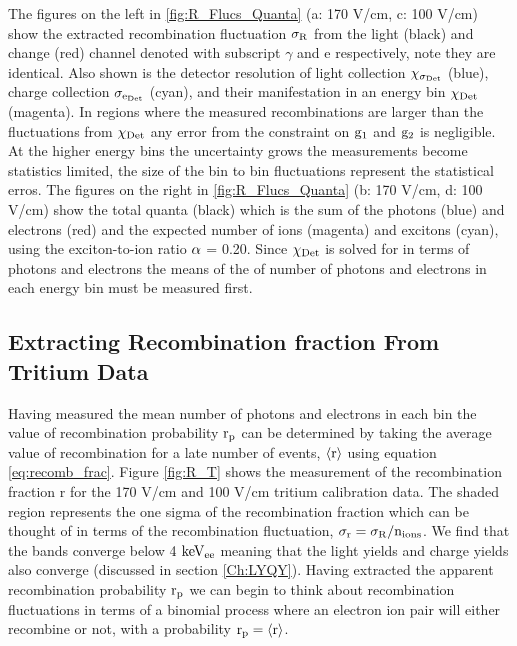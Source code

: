 The figures on the left in \ref{fig:R_Flucs_Quanta} (a: 170 V/cm, c: 100 V/cm) show the extracted recombination fluctuation $\rm \sigma_R$ from the light (black) and change (red) channel denoted with subscript $\gamma$ and e respectively, note they are identical. Also shown is the detector resolution of light collection $\rm \chi_{\sigma_{Det}}$ (blue), charge collection $\rm \sigma_{e_{Det}}$ (cyan), and their manifestation in an energy bin $\rm \chi_{Det}$ (magenta). In regions where the measured recombinations are larger than the fluctuations from $\rm \chi_{Det}$ any error from the constraint on $\rm g_1$ and $\rm g_2$ is negligible. At the higher energy bins the uncertainty grows the measurements become statistics limited, the size of the bin to bin fluctuations represent the statistical erros. The figures on the right in \ref{fig:R_Flucs_Quanta} (b: 170 V/cm, d: 100 V/cm) show the total quanta (black) which is the sum of the photons (blue) and electrons (red) and the expected number of ions (magenta) and excitons (cyan), using the exciton-to-ion ratio $\rm \alpha$ = 0.20. Since $\rm \chi_{Det}$ is solved for in terms of photons and electrons the means of the of number of photons and electrons in each energy bin must be measured first.

\newpage

\subsection{Extracting Recombination fraction From Tritium Data}

Having measured the mean number of photons and electrons in each bin the value of recombination probability $\rm r_p$ can be determined by taking the average value of recombination for a late number of events, $\rm \left<r\right>$ using equation \ref{eq:recomb_frac}. Figure \ref{fig:R_T} shows the measurement of the recombination fraction r for the 170 V/cm and 100 V/cm tritium calibration data. The shaded region represents the one sigma of the recombination fraction which can be thought of in terms of the recombination fluctuation, $\rm \sigma_r = \sigma_R / n_{ions} $. We find that the bands converge below 4 $\rm keV_{ee}$ meaning that the light yields and charge yields also converge (discussed in section \ref{Ch:LYQY}). Having extracted the apparent recombination probability $\rm r_p$ we can begin to think about recombination fluctuations in terms of a binomial process where an electron ion pair will either recombine or not, with a probability $\rm r_p=\left<r\right>$.

